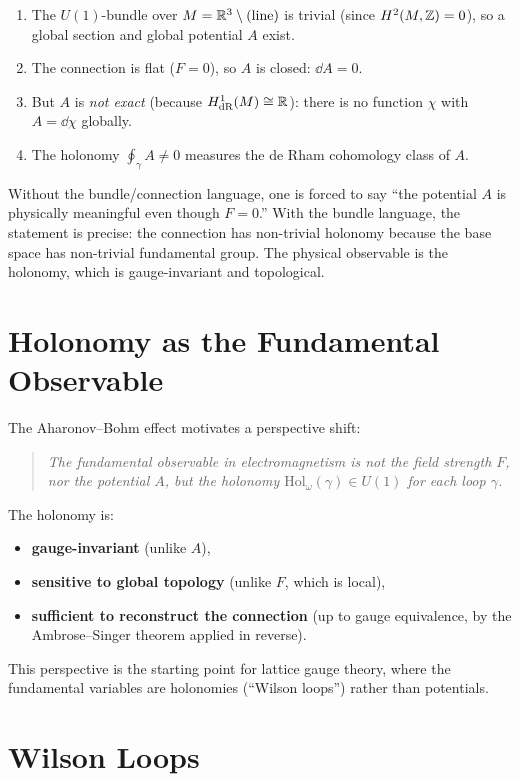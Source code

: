 \begin{enumerate}
\item The $U(1)$-bundle over $M = \mathbb{R}^3 \setminus (\text{line})$ is trivial (since $H^2(M, \mathbb{Z}) = 0$), so a global section and global potential $A$ exist.
\item The connection is flat ($F = 0$), so $A$ is closed: $\dd A = 0$.
\item But $A$ is \emph{not exact} (because $H^1_{\text{dR}}(M) \cong \mathbb{R}$): there is no function $\chi$ with $A = \dd\chi$ globally.
\item The holonomy $\oint_\gamma A \neq 0$ measures the de Rham cohomology class of $A$.
\end{enumerate}

Without the bundle/connection language, one is forced to say ``the potential $A$ is physically meaningful even though $F = 0$.'' With the bundle language, the statement is precise: the connection has non-trivial holonomy because the base space has non-trivial fundamental group. The physical observable is the holonomy, which is gauge-invariant and topological.

\section{Holonomy as the Fundamental Observable}

The Aharonov--Bohm effect motivates a perspective shift:

\begin{quote}
\emph{The fundamental observable in electromagnetism is not the field strength $F$, nor the potential $A$, but the holonomy $\mathrm{Hol}_\omega(\gamma) \in U(1)$ for each loop $\gamma$.}
\end{quote}

The holonomy is:
\begin{itemize}
\item \textbf{gauge-invariant} (unlike $A$),
\item \textbf{sensitive to global topology} (unlike $F$, which is local),
\item \textbf{sufficient to reconstruct the connection} (up to gauge equivalence, by the Ambrose--Singer theorem applied in reverse).
\end{itemize}

This perspective is the starting point for lattice gauge theory, where the fundamental variables are holonomies (``Wilson loops'') rather than potentials.

\section{Wilson Loops}

